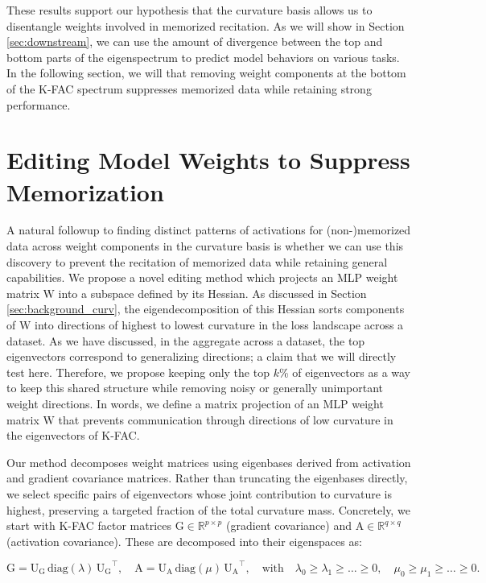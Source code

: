 \documentclass{article} %
\newcommand{\matr}[1]{\ensuremath{\bm{\mathrm{#1}}}}
\begin{document}
These results support our hypothesis that the curvature basis allows us to disentangle weights involved in memorized recitation. As we will show in Section \ref{sec:downstream}, we can use the amount of divergence between the top and bottom parts of the eigenspectrum to predict model behaviors on various tasks. 
In the following section, we will that removing weight components at the bottom of the K-FAC spectrum suppresses memorized data while retaining strong performance.
\section{Editing Model Weights to Suppress Memorization}
\label{sec:editing}
A natural followup to finding distinct patterns of activations for (non-)memorized data across weight components in the curvature basis is whether we can use this discovery to prevent the recitation of memorized data while retaining general capabilities. 
We propose a novel editing method which projects an MLP weight matrix \matr{W} into a subspace defined by its Hessian. As discussed in Section \ref{sec:background_curv}, the eigendecomposition of this Hessian sorts components of \matr{W} into directions of highest to lowest curvature in the loss landscape across a dataset. As we have discussed, in the aggregate across a dataset, the top eigenvectors correspond to generalizing directions; a claim that we will directly test here. Therefore, we propose keeping only the top $k$\% of eigenvectors as a way to keep this shared structure while removing noisy or generally unimportant weight directions. In words, we define a matrix projection of an MLP weight matrix \matr{W} that prevents communication through directions of low curvature in the eigenvectors of K-FAC.

 Our method decomposes weight matrices using eigenbases derived from activation and gradient covariance matrices. Rather than truncating the eigenbases directly, we select specific pairs of eigenvectors whose joint contribution to curvature is highest, preserving a targeted fraction of the total curvature mass. Concretely, we start with K-FAC factor matrices \( \matr{G} \in \mathbb{R}^{p\times p} \) (gradient covariance) and \( \matr{A} \in \mathbb{R}^{q\times q} \) (activation covariance). These are decomposed into their eigenspaces as:

 
\[
\matr{G} = \matr{U_G} \,\mathrm{diag}(\lambda)\, \matr{U_G}^\top,\quad
\matr{A} = \matr{U_A} \,\mathrm{diag}(\mu)\, \matr{U_A}^\top,\quad
\text{with}\quad \lambda_0 \ge \lambda_1 \ge \dots \ge 0,\quad \mu_0 \ge \mu_1 \ge \dots \ge 0.
\]
\end{document}
